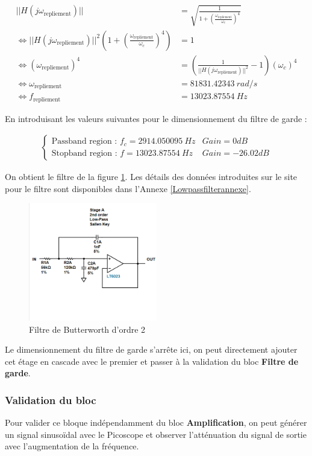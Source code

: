 \begin{align*} 
||H(j\omega_{\text{repliement}})|| &= \sqrt{\frac{1}{1+\left(\frac{\omega_{\text{repliement}}}{\omega_c}\right)^{4}}}\\
\iff ||H(j\omega_{\text{repliement}})||^{2} \left(1+\left(\frac{\omega_{\text{repliement}}}{\omega_c}\right)^{4}\right) &= 1\\
\iff (\omega_{\text{repliement}})^{4} &= \left(\frac{1}{||H(j\omega_{\text{repliement}})||^{2}}-1\right) {(\omega_c)^{4}} \\
\iff \omega_{\text{repliement}} &= 81831.42343 \ rad/s\\
\iff f_{\text{repliement}} &= 13023.87554 \ Hz
\end{align*}

En introduisant les valeurs suivantes pour le dimensionnement du filtre de garde :

\begin{align*}
\begin{cases}
\text{Passband region : }  f_c = 2914.050095 \ Hz & Gain=0dB \\
\text{Stopband region : }  f = 13023.87554 \ Hz  & Gain=-26.02dB
\end{cases}
\end{align*}

On obtient le filtre de la figure \ref{fig:filtregarde}. Les détails des données introduites sur le site pour le filtre sont disponibles dans l'Annexe \ref{Lowpassfilterannexe}.

\begin{figure}[H]
    \centering
    \includegraphics[width=0.5\textwidth]{Pictures/lowpass2.png}
    \caption{Filtre de Butterworth d'ordre 2}
    \label{fig:filtregarde}
\end{figure}

Le dimensionnement du filtre de garde s'arrête ici, on peut directement ajouter cet étage en cascade avec le premier et passer à la validation du bloc \textbf{Filtre de garde}.

\subsubsection{Validation du bloc}

Pour valider ce bloque indépendamment du bloc \textbf{Amplification}, on peut générer un signal sinusoïdal avec le Picoscope et observer l'atténuation du signal de sortie avec l'augmentation de la fréquence.
